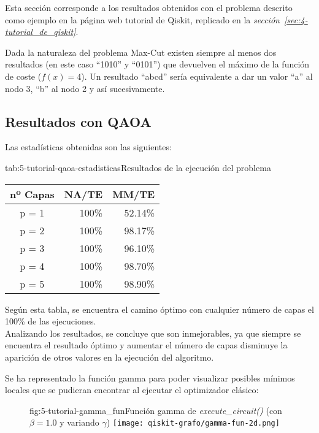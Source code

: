 Esta sección corresponde a los resultados obtenidos con el problema descrito como ejemplo en la página web tutorial de Qiskit\cite{qiskit_tutorial_antiguo}, replicado en la \textit{sección~\ref{sec:4-tutorial_de_qiskit}}.

Dada la naturaleza del problema Max-Cut existen siempre al menos dos resultados (en este caso ``1010'' y ``0101'') que devuelven el máximo de la función de coste ($f(x) = 4$).
Un resultado ``abcd'' sería equivalente a dar un valor ``a'' al nodo 3, ``b'' al nodo 2 y así sucesivamente.

\subsection{Resultados con QAOA}

Las estadísticas obtenidas son las siguientes:

\begin{table}[Resultados QAOA {--} max-cut en grafo de 4 aristas]{tab:5-tutorial-qaoa-estadisticas}{Resultados de la ejecución del problema~\cite{qiskit_tutorial_antiguo}}
  \begin{tabular}{|c|r|r|}
    \hline
    \textbf{nº Capas} & \textbf{NA/TE} & \textbf{MM/TE} \\ \hline
    p = 1 & 100\% & 52.14\% \\ \hline
    p = 2 & 100\% & 98.17\% \\ \hline
    p = 3 & 100\% & 96.10\% \\ \hline
    p = 4 & 100\% & 98.70\% \\ \hline
    p = 5 & 100\% & 98.90\% \\ \hline
  \end{tabular}
\end{table}

Según esta tabla, se encuentra el camino óptimo con cualquier número de capas el 100\% de las ejecuciones.
\\
Analizando los resultados, se concluye que son inmejorables, ya que siempre se encuentra el resultado óptimo y aumentar el número de capas disminuye la aparición de otros valores en la ejecución del algoritmo.

Se ha representado la función gamma para poder visualizar posibles mínimos locales que se pudieran encontrar al ejecutar el optimizador clásico:

\begin{figure}[Función gamma {--} max-cut en grafo de 4 aristas]{fig:5-tutorial-gamma_fun}{Función gamma de \textit{execute\_circuit()} (con $\beta = 1.0$ y variando $\gamma$)}
  \texttt{[image: qiskit-grafo/gamma-fun-2d.png]}
\end{figure}

